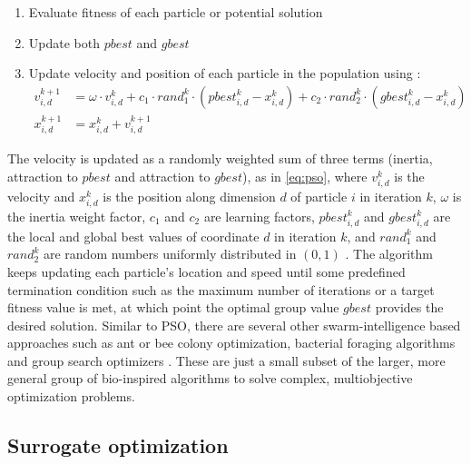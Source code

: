 \documentclass[final,3p,times]{elsarticle}
\begin{document}
\begin{enumerate}
    \item Evaluate fitness of each particle or potential solution
    \item Update both $pbest$ and $gbest$
    \item Update velocity and position of each particle in the population using \cite{wu2014}:
    \begin{align}
    \label{eq:pso}
        v_{i,d}^{k+1} & = \omega \cdot v_{i,d}^{k} + c_1 \cdot rand_1^k \cdot (pbest_{i,d}^k - x_{i,d}^{k}) + c_2 \cdot rand_2^k \cdot (gbest_{i,d}^k - x_{i,d}^k) \\
        x_{i,d}^{k+1} & = x_{i,d}^{k} + v_{i,d}^{k+1}
    \end{align}
\end{enumerate}

The velocity is updated as a randomly weighted sum of three terms (inertia, attraction to $pbest$ and attraction to $gbest$), as in \cref{eq:pso}, where $v_{i,d}^k$ is the velocity and $x_{i,d}^k$ is the position along dimension $d$ of particle $i$ in iteration $k$, $\omega$ is the inertia weight factor, $c_1$ and $c_2$ are learning factors, $pbest_{i,d}^k$ and $gbest_{i,d}^k$ are the local and global best values of coordinate $d$ in iteration $k$, and $rand_1^k$ and $rand_2^k$ are random numbers uniformly distributed in $(0,1)$ \cite{wu2014}. The algorithm keeps updating each particle's location and speed until some predefined termination condition such as the maximum number of iterations or a target fitness value is met, at which point the optimal group value $gbest$ provides the desired solution. Similar to PSO, there are several other swarm-intelligence based approaches such as ant or bee colony optimization, bacterial foraging algorithms and group search optimizers \cite{pathak2017}. These are just a small subset of the larger, more general group of bio-inspired algorithms to solve complex, multiobjective optimization problems.

\subsection{Surrogate optimization}
\end{document}
